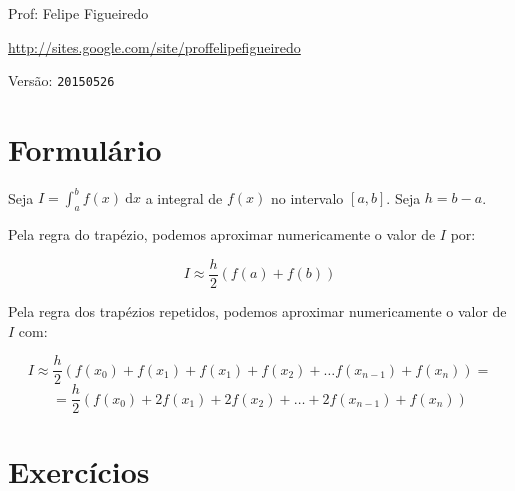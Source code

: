 \documentclass[a4paper]{article}
\newcommand{\ud}{\mathrm{\ d}}
\begin{document}
\parbox[c]{.825\textwidth}{\raggedright%
{Prof: Felipe Figueiredo\par}
{\url{http://sites.google.com/site/proffelipefigueiredo}\par}
}

Versão: \verb|20150526|



\section{Formulário}
Seja $I = \int_a^b f(x) \ud x$ a integral de $f(x)$ no intervalo
$[a,b]$. Seja $h=b-a$.

Pela regra do trapézio, podemos aproximar numericamente o valor de $I$
por:

\begin{displaymath}
  I \approx \frac{h}{2} \left( f(a) + f(b) \right)
\end{displaymath}

Pela regra dos trapézios repetidos, podemos aproximar numericamente o
valor de $I$ com:

\begin{displaymath}
  I \approx \frac{h}{2} ( f(x_0) + f(x_1) + f(x_1) + f(x_2) + \ldots
  f(x_{n-1}) + f(x_n) ) =
\end{displaymath}
\begin{displaymath}
  = \frac{h}{2} \left( f(x_0) + 2 f(x_1) + 2 f(x_2) +
    \ldots + 2 f(x_{n-1}) + f(x_n) \right)
\end{displaymath}

\section{Exercícios}
\end{document}
